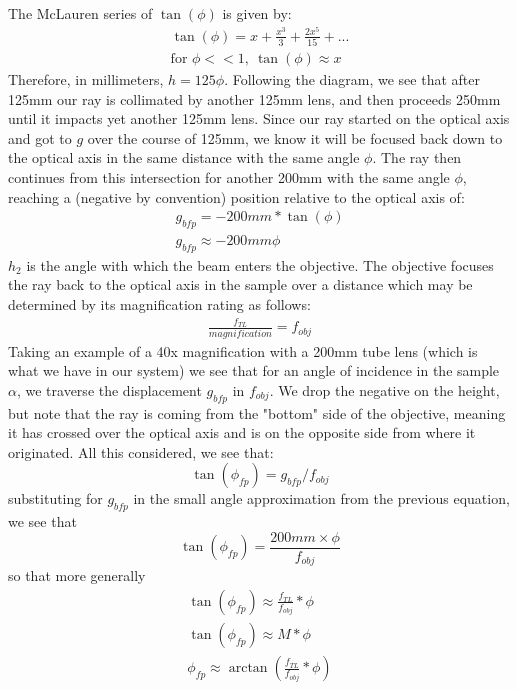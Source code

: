 The McLauren series of $\tan(\phi)$ is given by:
\begin{gather}
    \tan(\phi) = x+\frac{x^3}{3} + \frac{2x^5}{15} + ...\\
    \text{for   } \phi<<1, \ \tan(\phi) \approx x
\end{gather}
Therefore, in millimeters, $h = 125\phi$.
Following the diagram, we see that after 125mm our ray is collimated by another 125mm lens, and then proceeds 250mm until it impacts yet another 125mm lens. Since our ray started on the optical axis and got to $g$ over the course of 125mm, we know it will be focused back down to the optical axis in the same distance with the same angle $\phi$. The ray then continues from this intersection for another 200mm with the same angle $\phi$, reaching a  (negative by convention) position relative to the optical axis of:
\begin{gather}
    g_{bfp} = -200mm*\tan(\phi)\\
    g_{bfp} \approx -200mm \phi
\end{gather}
$h_2$ is the angle with which the beam enters the objective. The objective focuses the ray back to the optical axis in the sample over a distance which may be determined by its magnification rating as follows:
\begin{gather}
    \frac{f_{TL}}{magnification} = f_{obj}
\end{gather}
Taking an example of a 40x magnification with a 200mm tube lens (which is what we have in our system)
we see that for an angle of incidence in the sample $\alpha$, we traverse the displacement $g_{bfp}$ in $f_{obj}$. We drop the negative on the height, but note that the ray is coming from the "bottom" side of the objective, meaning it has crossed over the optical axis and is on the opposite side from where it originated. All this considered, we see that:
\begin{equation}
    \tan(\phi_{fp})= g_{bfp}/f_{obj}
\end{equation}
substituting for $g_{bfp}$ in the small angle approximation from the previous equation, we see that
\begin{equation}
    \tan(\phi_{fp}) = \frac{200mm \times \phi}{f_{obj}}
\end{equation}
so that more generally
\begin{gather}
    \tan(\phi_{fp}) \approx \frac{f_{TL}}{f_{obj}} * \phi\\
    \tan(\phi_{fp}) \approx M*\phi\\
    \phi_{fp} \approx \arctan(\frac{f_{TL}}{f_{obj}} * \phi)
\end{gather}
